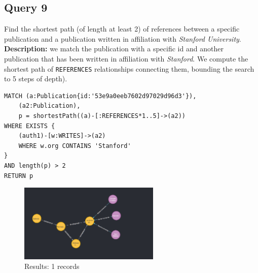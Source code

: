 \documentclass{Configuration_Files/PoliMi3i_thesis}
\begin{document}
\subsection{Query 9}
Find the shortest path (of length at least 2) of references between a specific publication and a publication written in
affiliation with \emph{Stanford University}.\\
\textbf{Description:} we match the publication with a specific id and another publication that has been written in
affiliation with \emph{Stanford}. We compute the shortest path of \verb |REFERENCES| relationships connecting them, bounding
the search to 5 steps of depth).
\begin{lstlisting}[language=cypher, label=lst:cypher-example]
MATCH (a:Publication{id:'53e9a0eeb7602d97029d96d3'}),
    (a2:Publication),
    p = shortestPath((a)-[:REFERENCES*1..5]->(a2))
WHERE EXISTS {
    (auth1)-[w:WRITES]->(a2)
    WHERE w.org CONTAINS 'Stanford'
}
AND length(p) > 2
RETURN p
\end{lstlisting}
\begin{figure}[H]
\centering
\includegraphics[width=0.6\textwidth]{query/query9.PNG}
\caption{Results: 1 records}
\label{fig:query9}
\end{figure}
\end{document}
